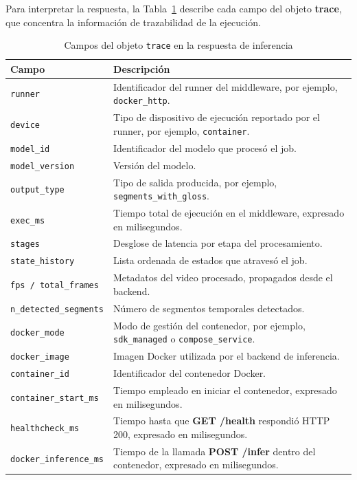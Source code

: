 \documentclass[11pt,a4paper]{article}
\begin{document}
Para interpretar la respuesta, la Tabla~\ref{tab:trace_campos} describe cada campo del objeto \textbf{trace}, que concentra la información de trazabilidad de la ejecución.

\begin{table}[H]
\centering
\caption{Campos del objeto \texttt{trace} en la respuesta de inferencia}
\label{tab:trace_campos}
\scriptsize
\renewcommand{\arraystretch}{1.08}
\setlength{\tabcolsep}{4pt}

\begin{tabular}{
    >{\raggedright\arraybackslash}p{4.2cm}
    >{\raggedright\arraybackslash}p{8.8cm}
}
\toprule
\textbf{Campo} & \textbf{Descripción} \\
\midrule
\texttt{runner} & Identificador del runner del middleware, por ejemplo, \texttt{docker\_http}. \\
\texttt{device} & Tipo de dispositivo de ejecución reportado por el runner, por ejemplo, \texttt{container}. \\
\texttt{model\_id} & Identificador del modelo que procesó el job. \\
\texttt{model\_version} & Versión del modelo. \\
\texttt{output\_type} & Tipo de salida producida, por ejemplo, \texttt{segments\_with\_gloss}. \\
\texttt{exec\_ms} & Tiempo total de ejecución en el middleware, expresado en milisegundos. \\
\texttt{stages} & Desglose de latencia por etapa del procesamiento. \\
\texttt{state\_history} & Lista ordenada de estados que atravesó el job. \\
\texttt{fps / total\_frames} & Metadatos del video procesado, propagados desde el backend. \\
\texttt{n\_detected\_segments} & Número de segmentos temporales detectados. \\
\texttt{docker\_mode} & Modo de gestión del contenedor, por ejemplo, \texttt{sdk\_managed} o \texttt{compose\_service}. \\
\texttt{docker\_image} & Imagen Docker utilizada por el backend de inferencia. \\
\texttt{container\_id} & Identificador del contenedor Docker. \\
\texttt{container\_start\_ms} & Tiempo empleado en iniciar el contenedor, expresado en milisegundos. \\
\texttt{healthcheck\_ms} & Tiempo hasta que \textbf{GET /health} respondió HTTP 200, expresado en milisegundos. \\
\texttt{docker\_inference\_ms} & Tiempo de la llamada \textbf{POST /infer} dentro del contenedor, expresado en milisegundos. \\
\bottomrule
\end{tabular}
\end{table}
\end{document}
